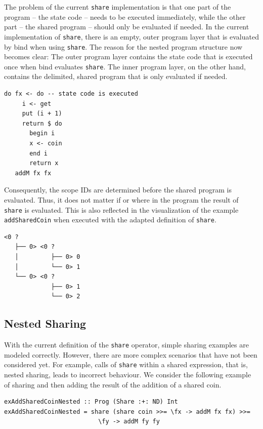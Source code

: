 \documentclass[a4paper, 11pt, fleqn, twoside]{scrreprt}
\newcommand{\hinl}[1]{\texttt{#1}}
\begin{document}
The problem of the current \hinl{share} implementation is that one part of the program -- the state code -- needs to be executed immediately, while the other part -- the shared program -- should only be evaluated if needed.
In the current implementation of \hinl{share}, there is an empty, outer program layer that is evaluated by bind when using \hinl{share}.
The reason for the nested program structure now becomes clear: The outer program layer contains the state code that is executed once when bind evaluates \hinl{share}.
The inner program layer, on the other hand, contains the delimited, shared program that is only evaluated if needed.

\begin{verbatim}
do fx <- do -- state code is executed
     i <- get
     put (i + 1)
     return $ do
       begin i
       x <- coin
       end i
       return x
   addM fx fx
\end{verbatim}

Consequently, the scope IDs are determined before the shared program is evaluated.
Thus, it does not matter if or where in the program the result of \hinl{share} is evaluated.
This is also reflected in the visualization of the example \hinl{addSharedCoin} when executed with the adapted definition of \hinl{share}.

\begin{verbatim}
<0 ? 
   ├── 0> <0 ? 
   │         ├── 0> 0
   │         └── 0> 1
   └── 0> <0 ? 
             ├── 0> 1
             └── 0> 2
\end{verbatim}

\subsection{Nested Sharing}
With the current definition of the \hinl{share} operator, simple sharing examples are modeled correctly.
However, there are more complex scenarios that have not been considered yet.
For example, calls of \hinl{share} within a shared expression, that is, nested sharing, leads to incorrect behaviour.
We consider the following example of sharing and then adding the result of the addition of a shared coin.

\begin{verbatim}
exAddSharedCoinNested :: Prog (Share :+: ND) Int
exAddSharedCoinNested = share (share coin >>= \fx -> addM fx fx) >>= 
                          \fy -> addM fy fy
\end{verbatim}
\end{document}
